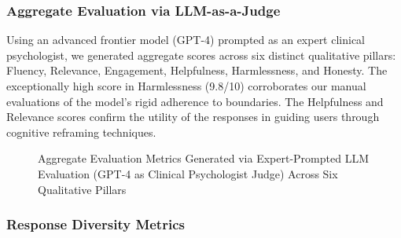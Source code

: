 \documentclass[12pt,twoside]{article}
\begin{document}
\subsubsection{Aggregate Evaluation via LLM-as-a-Judge}

Using an advanced frontier model (GPT-4) prompted as an expert clinical psychologist, we generated aggregate scores across six distinct qualitative pillars: Fluency, Relevance, Engagement, Helpfulness, Harmlessness, and Honesty. The exceptionally high score in Harmlessness (9.8/10) corroborates our manual evaluations of the model's rigid adherence to boundaries. The Helpfulness and Relevance scores confirm the utility of the responses in guiding users through cognitive reframing techniques.

\begin{figure}[H]
\centering
{}
\caption{Aggregate Evaluation Metrics Generated via Expert-Prompted LLM Evaluation (GPT-4 as Clinical Psychologist Judge) Across Six Qualitative Pillars}
\label{fig:llm_judge}
\end{figure}

\subsubsection{Response Diversity Metrics}
\end{document}
